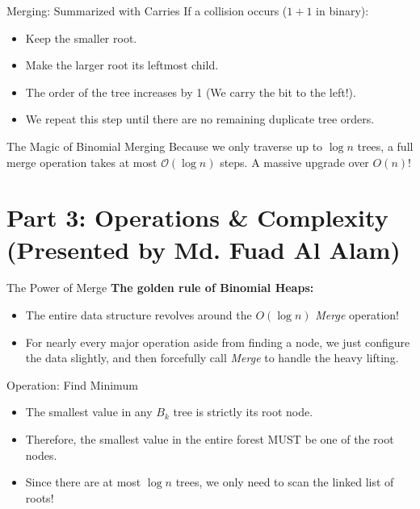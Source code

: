 \documentclass[11pt, aspectratio=169]{beamer}
\begin{document}
\begin{frame}{Merging: Summarized with Carries}
    If a collision occurs ($1 + 1$ in binary):
    \vspace{0.3cm}
    \begin{itemize}
        \item Keep the smaller root.
        \item Make the larger root its leftmost child.
        \item The order of the tree increases by 1 (We carry the bit to the left!).
        \item We repeat this step until there are no remaining duplicate tree orders.
    \end{itemize}
    \vspace{0.5cm}
    \begin{alertblock}{The Magic of Binomial Merging}
        Because we only traverse up to $\log n$ trees, a full merge operation takes at most \textbf{$\mathcal{O}(\log n)$} steps. A massive upgrade over $O(n)$!
    \end{alertblock}
\end{frame}


\section{Part 3: Operations \& Complexity\\ \small{(Presented by Md. Fuad Al Alam)}}

\begin{frame}{The Power of Merge}
    \textbf{The golden rule of Binomial Heaps:}
    \vspace{0.3cm}
    \begin{itemize}
        \item The entire data structure revolves around the $O(\log n)$ \textit{Merge} operation!
        \item For nearly every major operation aside from finding a node, we just configure the data slightly, and then forcefully call \textit{Merge} to handle the heavy lifting.
    \end{itemize}
\end{frame}

\begin{frame}{Operation: Find Minimum}
    \begin{itemize}
        \item The smallest value in any $B_k$ tree is strictly its root node.
        \item Therefore, the smallest value in the entire forest MUST be one of the root nodes.
        \item Since there are at most $\log n$ trees, we only need to scan the linked list of roots!
    \end{itemize}
\end{frame}
\end{document}
